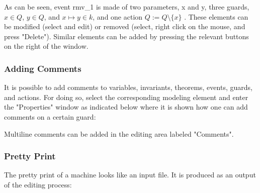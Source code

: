 
As can be seen, event rmv\_1 is made of two parameters, x and y, three guards, $x \in Q$, $y \in Q$, and $x \mapsto y \in k$, and one action $Q := Q \setminus \{ x\}$ . These elements can be modified (select and edit) or removed (select, right click on the mouse, and press "Delete"). Similar elements can be added by pressing the relevant buttons on the right of the window. 

\subsubsection{Adding Comments}

It is possible to add comments to variables, invariants, theorems, events, guards, and actions. For doing so, select the corresponding modeling element and enter the "Properties" window as indicated below where it is shown how one can add comments on a certain guard: 


Multiline comments can be added in the editing area labeled "Comments". 

\subsubsection{Pretty Print}

The pretty print of a machine looks like an input file. It is produced as an output of the editing process: 


